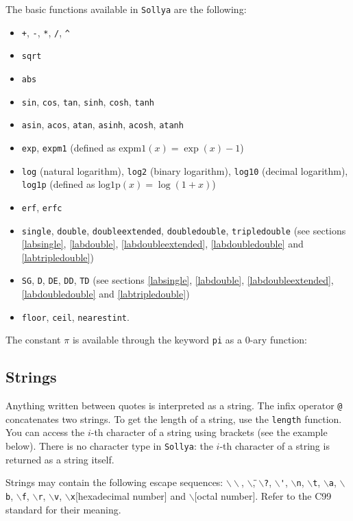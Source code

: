 \documentclass[a4paper]{article}
\newcommand{\com}[1]{\texttt{#1}}
\newcommand{\key}[1]{\texttt{#1}}
\newcommand{\sollya}{\texttt{Sollya}\xspace}
\begin{document}
The basic functions available in \sollya are the following:
\begin{itemize}
\item \com{+}, \com{-}, \com{*}, \com{/}, \com{\^{}}
\item \com{sqrt}
\item \com{abs}
\item \com{sin}, \com{cos}, \com{tan}, \com{sinh}, \com{cosh}, \com{tanh}
\item \com{asin}, \com{acos}, \com{atan}, \com{asinh}, \com{acosh}, \com{atanh}
\item \com{exp}, \com{expm1} (defined as $\mathrm{expm1}(x) = \exp(x)-1$)
\item \com{log} (natural logarithm), \com{log2} (binary logarithm), \com{log10} (decimal logarithm), \com{log1p} (defined as $\mathrm{log1p}(x) = \log(1+x)$)
\item \com{erf}, \com{erfc}
\item \com{single}, \com{double}, \com{doubleextended}, \com{doubledouble}, \com{tripledouble} (see sections \ref{labsingle}, \ref{labdouble}, \ref{labdoubleextended}, \ref{labdoubledouble} and \ref{labtripledouble})
\item \com{SG}, \com{D}, \com{DE}, \com{DD}, \com{TD} (see sections \ref{labsingle}, \ref{labdouble}, \ref{labdoubleextended}, \ref{labdoubledouble} and \ref{labtripledouble})
\item \com{floor}, \com{ceil}, \com{nearestint}.
\end{itemize}

The constant $\pi$ is available through the keyword \key{pi} as a $0$-ary function: 



\subsection{Strings}
Anything written between quotes is interpreted as a string. The infix operator \com{@} concatenates two strings. To get the length of a string, use the \com{length} function. You can access the $i$-th character of a string using brackets (see the example below). There is no character type in \sollya: the $i$-th character of a string is returned as a string itself.



Strings may contain the following escape sequences:
\texttt{$\backslash\backslash$}, \texttt{$\backslash$\"},
\texttt{$\backslash$?}, \texttt{$\backslash$\'},
\texttt{$\backslash$n}, \texttt{$\backslash$t},
\texttt{$\backslash$a}, \texttt{$\backslash$b},
\texttt{$\backslash$f}, \texttt{$\backslash$r},
\texttt{$\backslash$v}, \texttt{$\backslash$x}[hexadecimal number] and
\texttt{$\backslash$}[octal number]. Refer to the C99 standard for their
meaning.
\end{document}
